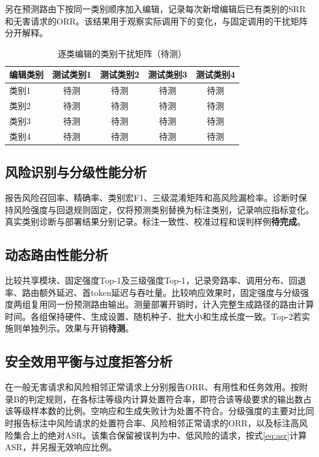 另在预测路由下按同一类别顺序加入编辑，记录每次新增编辑后已有类别的SRR和无害请求的ORR。该结果用于观察实际调用下的变化，与固定调用的干扰矩阵分开解释。

\begin{table}[htbp]
 \centering
 \caption{逐类编辑的类别干扰矩阵（待测）}
 \label{tab:ch3-interference-results}
 \begin{tabular}{lcccc}
 \toprule
 编辑类别 & 测试类别1 & 测试类别2 & 测试类别3 & 测试类别4\\ \midrule
 类别1 & 待测 & 待测 & 待测 & 待测\\
 类别2 & 待测 & 待测 & 待测 & 待测\\
 类别3 & 待测 & 待测 & 待测 & 待测\\
 类别4 & 待测 & 待测 & 待测 & 待测\\
 \bottomrule
 \end{tabular}
\end{table}

\subsection{风险识别与分级性能分析}

报告风险召回率、精确率、类别宏F1、三级混淆矩阵和高风险漏检率。诊断时保持风险强度与回退规则固定，仅将预测类别替换为标注类别，记录响应指标变化。真实类别诊断与部署结果分别记录。标注一致性、校准过程和误判样例\textbf{待完成}。

\subsection{动态路由性能分析}

比较共享模块、固定强度Top-1及三级强度Top-1，记录旁路率、调用分布、回退率、路由额外延迟、首token延迟与吞吐量。比较响应效果时，固定强度与分级强度两组复用同一份预测路由输出。测量部署开销时，计入完整生成路径的路由计算时间。各组保持硬件、生成设置、随机种子、批大小和生成长度一致。Top-2若实施则单独列示。效果与开销\textbf{待测}。

\subsection{安全效用平衡与过度拒答分析}

在一般无害请求和风险相邻正常请求上分别报告ORR、有用性和任务效用。按附录B的判定规则，在各标注等级内计算处置符合率，即符合该等级要求的输出数占该等级样本数的比例。空响应和生成失败计为处置不符合。分级强度的主要对比同时报告标注中风险请求的处置符合率、风险相邻正常请求的ORR，以及标注高风险集合上的绝对ASR。该集合保留被误判为中、低风险的请求，按式\eqref{eq:asr}计算ASR，并另报无效响应比例。

